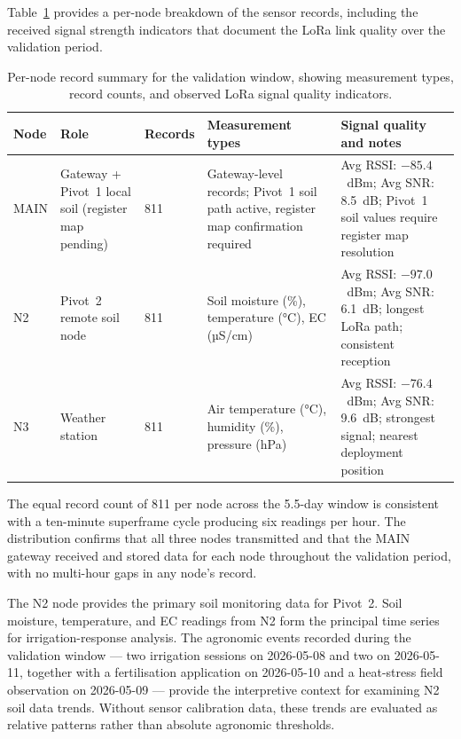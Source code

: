 Table~\ref{tab:node-data-summary} provides a per-node breakdown of the sensor records, including the received signal strength indicators that document the LoRa link quality over the validation period.

\begin{table}[H]
\centering
\caption{Per-node record summary for the validation window, showing measurement types, record counts, and observed LoRa signal quality indicators.}
\label{tab:node-data-summary}
\small
\begin{tabular}{p{1.5cm} p{3.0cm} p{1.5cm} p{3.0cm} p{4.5cm}}
\hline
\textbf{Node} & \textbf{Role} & \textbf{Records} & \textbf{Measurement types} & \textbf{Signal quality and notes} \\
\hline
MAIN & Gateway + Pivot~1 local soil (register map pending) & 811 & Gateway-level records; Pivot~1 soil path active, register map confirmation required & Avg RSSI: $-85.4$~dBm; Avg SNR: 8.5~dB; Pivot~1 soil values require register map resolution \\
\hline
N2 & Pivot~2 remote soil node & 811 & Soil moisture (\%), temperature (°C), EC (µS/cm) & Avg RSSI: $-97.0$~dBm; Avg SNR: 6.1~dB; longest LoRa path; consistent reception \\
\hline
N3 & Weather station & 811 & Air temperature (°C), humidity (\%), pressure (hPa) & Avg RSSI: $-76.4$~dBm; Avg SNR: 9.6~dB; strongest signal; nearest deployment position \\
\hline
\end{tabular}
\end{table}

The equal record count of 811 per node across the 5.5-day window is consistent with a ten-minute superframe cycle producing six readings per hour. The distribution confirms that all three nodes transmitted and that the MAIN gateway received and stored data for each node throughout the validation period, with no multi-hour gaps in any node's record.

The N2 node provides the primary soil monitoring data for Pivot~2. Soil moisture, temperature, and EC readings from N2 form the principal time series for irrigation-response analysis. The agronomic events recorded during the validation window — two irrigation sessions on 2026-05-08 and two on 2026-05-11, together with a fertilisation application on 2026-05-10 and a heat-stress field observation on 2026-05-09 — provide the interpretive context for examining N2 soil data trends. Without sensor calibration data, these trends are evaluated as relative patterns rather than absolute agronomic thresholds.

